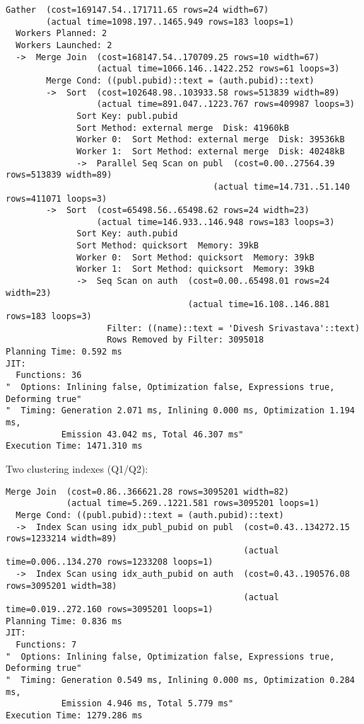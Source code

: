 \documentclass[11pt]{scrartcl}
\begin{document}
  {\small
\parskip0pt\begin{verbatim}
Gather  (cost=169147.54..171711.65 rows=24 width=67)
        (actual time=1098.197..1465.949 rows=183 loops=1)
  Workers Planned: 2
  Workers Launched: 2
  ->  Merge Join  (cost=168147.54..170709.25 rows=10 width=67)
                  (actual time=1066.146..1422.252 rows=61 loops=3)
        Merge Cond: ((publ.pubid)::text = (auth.pubid)::text)
        ->  Sort  (cost=102648.98..103933.58 rows=513839 width=89)
                  (actual time=891.047..1223.767 rows=409987 loops=3)
              Sort Key: publ.pubid
              Sort Method: external merge  Disk: 41960kB
              Worker 0:  Sort Method: external merge  Disk: 39536kB
              Worker 1:  Sort Method: external merge  Disk: 40248kB
              ->  Parallel Seq Scan on publ  (cost=0.00..27564.39 rows=513839 width=89)
                                         (actual time=14.731..51.140 rows=411071 loops=3)
        ->  Sort  (cost=65498.56..65498.62 rows=24 width=23)
                  (actual time=146.933..146.948 rows=183 loops=3)
              Sort Key: auth.pubid
              Sort Method: quicksort  Memory: 39kB
              Worker 0:  Sort Method: quicksort  Memory: 39kB
              Worker 1:  Sort Method: quicksort  Memory: 39kB
              ->  Seq Scan on auth  (cost=0.00..65498.01 rows=24 width=23)
                                    (actual time=16.108..146.881 rows=183 loops=3)
                    Filter: ((name)::text = 'Divesh Srivastava'::text)
                    Rows Removed by Filter: 3095018
Planning Time: 0.592 ms
JIT:
  Functions: 36
"  Options: Inlining false, Optimization false, Expressions true, Deforming true"
"  Timing: Generation 2.071 ms, Inlining 0.000 ms, Optimization 1.194 ms,
           Emission 43.042 ms, Total 46.307 ms"
Execution Time: 1471.310 ms
\end{verbatim}}

Two clustering indexes  (Q1/Q2):
{\small
\parskip0pt\begin{verbatim}
Merge Join  (cost=0.86..366621.28 rows=3095201 width=82)
            (actual time=5.269..1221.581 rows=3095201 loops=1)
  Merge Cond: ((publ.pubid)::text = (auth.pubid)::text)
  ->  Index Scan using idx_publ_pubid on publ  (cost=0.43..134272.15 rows=1233214 width=89)
                                               (actual time=0.006..134.270 rows=1233208 loops=1)
  ->  Index Scan using idx_auth_pubid on auth  (cost=0.43..190576.08 rows=3095201 width=38)
                                               (actual time=0.019..272.160 rows=3095201 loops=1)
Planning Time: 0.836 ms
JIT:
  Functions: 7
"  Options: Inlining false, Optimization false, Expressions true, Deforming true"
"  Timing: Generation 0.549 ms, Inlining 0.000 ms, Optimization 0.284 ms,
           Emission 4.946 ms, Total 5.779 ms"
Execution Time: 1279.286 ms

\end{verbatim}}
\end{document}
